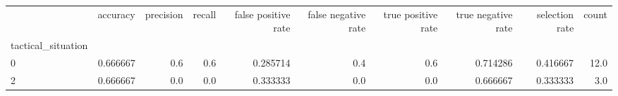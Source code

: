 \begin{tabular}{lrrrrrrrrr}
\toprule
{} &  accuracy &  precision &  recall &  false positive rate &  false negative rate &  true positive rate &  true negative rate &  selection rate &  count \\
tactical\_situation &           &            &         &                      &                      &                     &                     &                 &        \\
\midrule
0                  &  0.666667 &        0.6 &     0.6 &             0.285714 &                  0.4 &                 0.6 &            0.714286 &        0.416667 &   12.0 \\
2                  &  0.666667 &        0.0 &     0.0 &             0.333333 &                  0.0 &                 0.0 &            0.666667 &        0.333333 &    3.0 \\
\bottomrule
\end{tabular}
